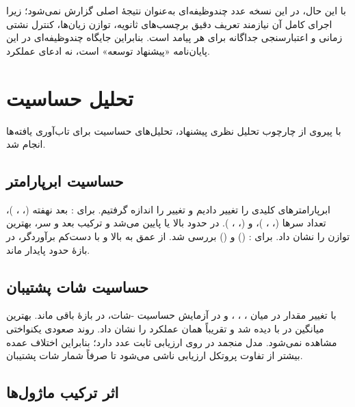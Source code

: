 با این حال، در این نسخه عدد چندوظیفه‌ای به‌عنوان نتیجۀ اصلی گزارش نمی‌شود؛ زیرا اجرای کامل آن نیازمند تعریف دقیق برچسب‌های ثانویه، توازن زیان‌ها، کنترل نشتی زمانی و اعتبارسنجی جداگانه برای هر پیامد است. بنابراین جایگاه چندوظیفه‌ای در این پایان‌نامه «پیشنهاد توسعه» است، نه ادعای عملکرد.

\section{تحلیل حساسیت}

با پیروی از چارچوب تحلیل نظری پیشنهاد، تحلیل‌های حساسیت برای تاب‌آوری یافته‌ها انجام شد.

\subsection{حساسیت ابرپارامتر}

ابرپارامترهای کلیدی را تغییر دادیم و تغییر  را اندازه گرفتیم. برای : بعد نهفته (، ، )، تعداد سرها (، ، )، و  (، ، ).  در حدود  بالا یا پایین می‌شد و ترکیب  بعد و  سر، بهترین توازن را نشان داد. برای : \texttt{} () و \texttt{} () بررسی شد.  از عمق  به بالا و با دست‌کم  برآوردگر، در بازۀ حدود  پایدار ماند.

\subsection{حساسیت شات پشتیبان }

با تغییر مقدار  در میان ، ، ،  و  در آزمایش حساسیت -شات،  در بازۀ  باقی ماند. بهترین میانگین در  با  دیده شد و  تقریباً همان عملکرد را نشان داد. روند صعودی یکنواختی مشاهده نمی‌شود. مدل منجمد \texttt{} در  روی ارزیابی ثابت عدد  دارد؛ بنابراین اختلاف عمده بیشتر از تفاوت پروتکل ارزیابی ناشی می‌شود تا صرفاً شمار شات پشتیبان.

\subsection{اثر ترکیب ماژول‌ها}

